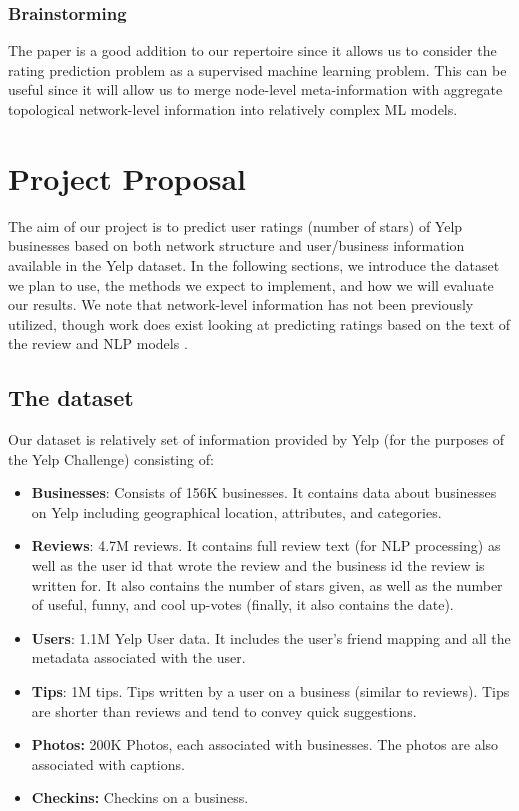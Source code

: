 \documentclass[letterpaper, 11 pt, conference]{ieeeconf}  %
\begin{document}
\subsubsection{Brainstorming}
The paper is a good addition to our repertoire since it allows us to consider the rating prediction problem as a supervised machine learning problem. This can be useful since it will allow us to merge node-level meta-information with aggregate topological network-level information into relatively complex ML models.

\section{Project Proposal}
The aim of our project is to predict user ratings (number of stars) of Yelp businesses based on both network structure and user/business information available in the Yelp dataset. In the following sections, we introduce the dataset we plan to use, the methods we expect to implement, and how we will evaluate our results. We note that network-level information has not been previously utilized, though work does exist looking at predicting ratings based on the text of the review and NLP models \cite{PredictionYelpReviewStarRatingUsingSentimentAnalysis}.

\subsection{The dataset}
Our dataset is relatively set of information provided by Yelp (for the purposes of the Yelp Challenge) consisting of:
\begin{itemize}
\item \textbf{Businesses}: Consists of 156K businesses. It contains data about businesses on Yelp including geographical location, attributes, and categories.
\item \textbf{Reviews}: 4.7M reviews. It contains full review text (for NLP processing) as well as the user id that wrote the review and the business id the review is written for. It also contains the number of stars given, as well as the number of useful, funny, and cool up-votes (finally, it also contains the date).
\item \textbf{Users}: 1.1M Yelp User data. It includes the user's friend mapping and all the metadata associated with the user.
\item \textbf{Tips}: 1M tips. Tips written by a user on a business (similar to reviews). Tips are shorter than reviews and tend to convey quick suggestions.
\item \textbf{Photos:} 200K Photos, each associated with businesses. The photos are also associated with captions.
\item \textbf{Checkins:} Checkins on a business.
\end{itemize}
\end{document}
